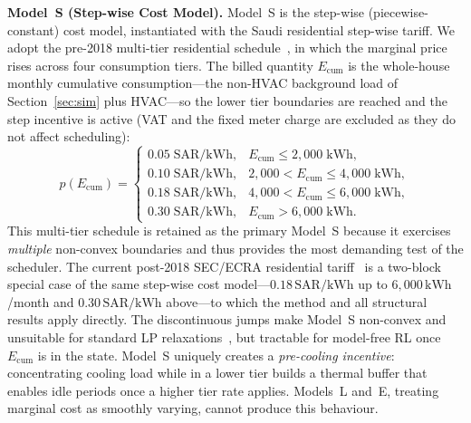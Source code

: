\documentclass[3p,number]{elsarticle}
\newcommand{\SAR}{\text{SAR}}
\newcommand{\kWh}{\text{kWh}}
\begin{document}
\textbf{Model~S (Step-wise Cost Model).}
Model~S is the step-wise (piecewise-constant) cost model, instantiated with the Saudi residential step-wise tariff. We adopt the pre-2018 multi-tier residential schedule~\cite{Nahiduzzaman2023}, in which the marginal price rises across four consumption tiers. The billed quantity $E_{\mathrm{cum}}$ is the whole-house monthly cumulative consumption---the non-HVAC background load of Section~\ref{sec:sim} plus HVAC---so the lower tier boundaries are reached and the step incentive is active (VAT and the fixed meter charge are excluded as they do not affect scheduling):
\begin{equation}
  p(E_{\mathrm{cum}})=
  \begin{cases}
    0.05\;\SAR/\kWh, & E_{\mathrm{cum}}\le2{,}000\;\kWh,\\
    0.10\;\SAR/\kWh, & 2{,}000<E_{\mathrm{cum}}\le4{,}000\;\kWh,\\
    0.18\;\SAR/\kWh, & 4{,}000<E_{\mathrm{cum}}\le6{,}000\;\kWh,\\
    0.30\;\SAR/\kWh, & E_{\mathrm{cum}}>6{,}000\;\kWh.
  \end{cases}
  \label{eq:stepwise}
\end{equation}
This multi-tier schedule is retained as the primary Model~S because it exercises \emph{multiple} non-convex boundaries and thus provides the most demanding test of the scheduler. The current post-2018 SEC/ECRA residential tariff~\cite{SEC2024} is a two-block special case of the same step-wise cost model---$0.18\,\SAR/\kWh$ up to $6{,}000\,\kWh$/month and $0.30\,\SAR/\kWh$ above---to which the method and all structural results apply directly. The discontinuous jumps make Model~S non-convex and unsuitable for standard LP relaxations~\cite{Risbeck2017}, but tractable for model-free RL once $E_{\mathrm{cum}}$ is in the state.
Model~S uniquely creates a \emph{pre-cooling incentive}: concentrating cooling load while in a lower tier builds a thermal buffer that enables idle periods once a higher tier rate applies.
Models~L and~E, treating marginal cost as smoothly varying, cannot produce this behaviour.
 
\end{document}
